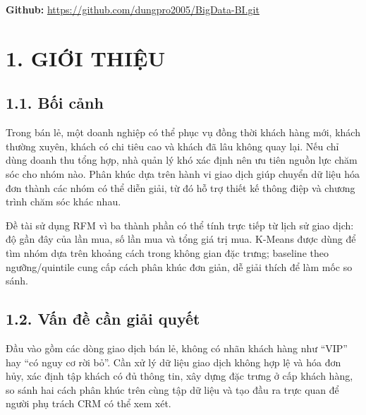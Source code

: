 \documentclass[a4paper]{article}
\begin{document}
\begin{titlepage}
\vfill
\begin{center}
\textbf{Github:} \url{https://github.com/dungpro2005/BigData-BI.git}
\end{center}

\end{titlepage}

\newpage

\renewcommand{\contentsname}{MỤC LỤC}
\setcounter{tocdepth}{2}
\tableofcontents
\thispagestyle{fancy}

\clearpage



\section*{1. GIỚI THIỆU}

\subsection*{1.1. Bối cảnh}

Trong bán lẻ, một doanh nghiệp có thể phục vụ đồng thời khách hàng mới, khách thường xuyên, khách có chi tiêu cao và khách đã lâu không quay lại. Nếu chỉ dùng doanh thu tổng hợp, nhà quản lý khó xác định nên ưu tiên nguồn lực chăm sóc cho nhóm nào. Phân khúc dựa trên hành vi giao dịch giúp chuyển dữ liệu hóa đơn thành các nhóm có thể diễn giải, từ đó hỗ trợ thiết kế thông điệp và chương trình chăm sóc khác nhau.

Đề tài sử dụng RFM vì ba thành phần có thể tính trực tiếp từ lịch sử giao dịch: độ gần đây của lần mua, số lần mua và tổng giá trị mua. K-Means được dùng để tìm nhóm dựa trên khoảng cách trong không gian đặc trưng; baseline theo ngưỡng/quintile cung cấp cách phân khúc đơn giản, dễ giải thích để làm mốc so sánh.

\subsection*{1.2. Vấn đề cần giải quyết}

Đầu vào gồm các dòng giao dịch bán lẻ, không có nhãn khách hàng như “VIP” hay “có nguy cơ rời bỏ”. Cần xử lý dữ liệu giao dịch không hợp lệ và hóa đơn hủy, xác định tập khách có đủ thông tin, xây dựng đặc trưng ở cấp khách hàng, so sánh hai cách phân khúc trên cùng tập dữ liệu và tạo đầu ra trực quan để người phụ trách CRM có thể xem xét.
\end{document}
